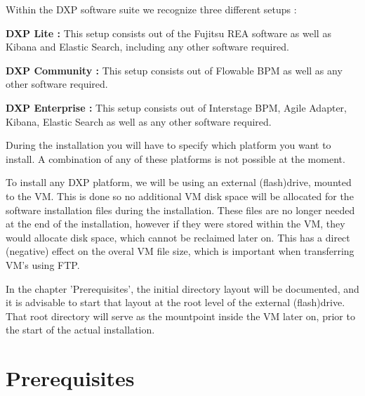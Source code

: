 \begin{myindent}
Within the DXP software suite we recognize three different setups :
\newline

\noindent \textbf{DXP Lite :} This setup consists out of the Fujitsu REA software as well as Kibana and Elastic Search, including any other software required.
\newline

\noindent \textbf{DXP Community :} This setup consists out of Flowable BPM as well as any other software required.
\newline

\noindent \textbf{DXP Enterprise :} This setup consists out of Interstage BPM, Agile Adapter, Kibana, Elastic Search as well as any other software required.
\newline

\noindent During the installation you will have to specify which platform you want to install. A combination of any of these platforms is not possible at the moment.
\newline

\noindent To install any DXP platform, we will be using an external (flash)drive, mounted to the VM. This is done so no additional VM disk space will be allocated for the
software installation files during the installation. These files are no longer needed at the end of the installation, however if they were stored within the VM,
they would allocate disk space, which cannot be reclaimed later on. This has a direct (negative) effect on the overal VM file size, which is important when transferring
VM's using FTP.
\newline

\noindent In the chapter 'Prerequisites', the initial directory layout will be documented, and it is advisable to start that layout at the root level of the external (flash)drive.
That root directory will serve as the mountpoint inside the VM later on, prior to the start of the actual installation.
\end{myindent}

\chapter{Prerequisites}

